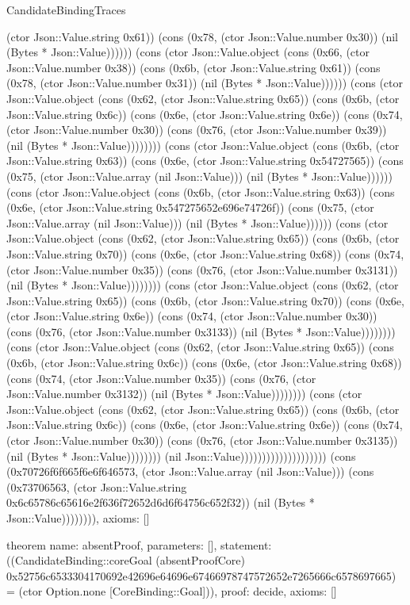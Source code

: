 \begin{lexlean}{CandidateBindingTraces}
\begin{semanticmodule}
{(ctor Json::Value.string 0x61)) (cons (0x78, (ctor Json::Value.number 0x30)) (nil (Bytes * Json::Value)))))) (cons (ctor Json::Value.object (cons (0x66, (ctor Json::Value.number 0x38)) (cons (0x6b, (ctor Json::Value.string 0x61)) (cons (0x78, (ctor Json::Value.number 0x31)) (nil (Bytes * Json::Value)))))) (cons (ctor Json::Value.object (cons (0x62, (ctor Json::Value.string 0x65)) (cons (0x6b, (ctor Json::Value.string 0x6c)) (cons (0x6e, (ctor Json::Value.string 0x6e)) (cons (0x74, (ctor Json::Value.number 0x30)) (cons (0x76, (ctor Json::Value.number 0x39)) (nil (Bytes * Json::Value)))))))) (cons (ctor Json::Value.object (cons (0x6b, (ctor Json::Value.string 0x63)) (cons (0x6e, (ctor Json::Value.string 0x54727565)) (cons (0x75, (ctor Json::Value.array (nil Json::Value))) (nil (Bytes * Json::Value)))))) (cons (ctor Json::Value.object (cons (0x6b, (ctor Json::Value.string 0x63)) (cons (0x6e, (ctor Json::Value.string 0x547275652e696e74726f)) (cons (0x75, (ctor Json::Value.array (nil Json::Value))) (nil (Bytes * Json::Value)))))) (cons (ctor Json::Value.object (cons (0x62, (ctor Json::Value.string 0x65)) (cons (0x6b, (ctor Json::Value.string 0x70)) (cons (0x6e, (ctor Json::Value.string 0x68)) (cons (0x74, (ctor Json::Value.number 0x35)) (cons (0x76, (ctor Json::Value.number 0x3131)) (nil (Bytes * Json::Value)))))))) (cons (ctor Json::Value.object (cons (0x62, (ctor Json::Value.string 0x65)) (cons (0x6b, (ctor Json::Value.string 0x70)) (cons (0x6e, (ctor Json::Value.string 0x6e)) (cons (0x74, (ctor Json::Value.number 0x30)) (cons (0x76, (ctor Json::Value.number 0x3133)) (nil (Bytes * Json::Value)))))))) (cons (ctor Json::Value.object (cons (0x62, (ctor Json::Value.string 0x65)) (cons (0x6b, (ctor Json::Value.string 0x6c)) (cons (0x6e, (ctor Json::Value.string 0x68)) (cons (0x74, (ctor Json::Value.number 0x35)) (cons (0x76, (ctor Json::Value.number 0x3132)) (nil (Bytes * Json::Value)))))))) (cons (ctor Json::Value.object (cons (0x62, (ctor Json::Value.string 0x65)) (cons (0x6b, (ctor Json::Value.string 0x6c)) (cons (0x6e, (ctor Json::Value.string 0x6e)) (cons (0x74, (ctor Json::Value.number 0x30)) (cons (0x76, (ctor Json::Value.number 0x3135)) (nil (Bytes * Json::Value)))))))) (nil Json::Value)))))))))))))))))))) (cons (0x70726f6f665f6e6f646573, (ctor Json::Value.array (nil Json::Value))) (cons (0x73706563, (ctor Json::Value.string 0x6c65786c65616e2f636f72652d6d6f64756c652f32)) (nil (Bytes * Json::Value)))))))),
 axioms: []
}

theorem{
 name: absentProof,
 parameters: [],
 statement: ((CandidateBinding::coreGoal (absentProofCore) 0x52756c6533304170692e42696e64696e67466978747572652e7265666c6578697665) = (ctor Option.none [CoreBinding::Goal])),
 proof: decide{},
 axioms: []
}


\end{semanticmodule}
\end{lexlean}
